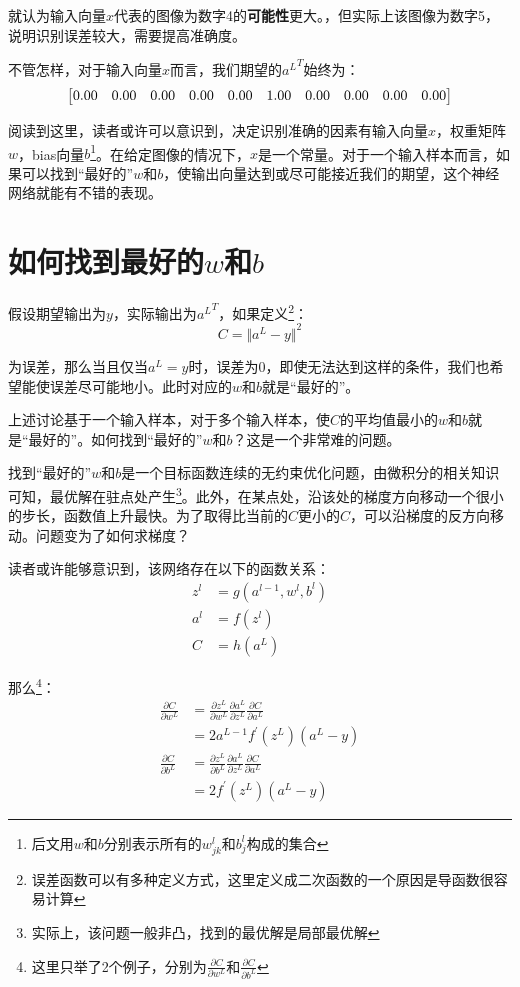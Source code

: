 \documentclass[titlepage,UTF8,zihao=-4]{ctexart}
\begin{document}
就认为输入向量$x$代表的图像为数字4的\textbf{可能性}更大。，但实际上该图像为数字5，说明识别误差较大，需要提高准确度。

不管怎样，对于输入向量$x$而言，我们期望的${a^{L}}^T$始终为：
\begin{equation*}
\begin{bmatrix}
\addtocounter{MaxMatrixCols}{28}
0.00 &
0.00 &
0.00 &
0.00 &
0.00 &
1.00 &
0.00 &
0.00 &   
0.00 &
0.00 
\end{bmatrix}
\end{equation*}

阅读到这里，读者或许可以意识到，决定识别准确的因素有输入向量$x$，权重矩阵$w$，bias向量$b$\footnote{后文用$w$和$b$分别表示所有的$w^{l}_{jk}$和$b^{l}_{j}$构成的集合}。在给定图像的情况下，$x$是一个常量。对于一个输入样本而言，如果可以找到“最好的”$w$和$b$，使输出向量达到或尽可能接近我们的期望，这个神经网络就能有不错的表现。

\section{如何找到最好的$w$和$b$}

假设期望输出为$y$，实际输出为${a^{L}}^T$，如果定义\footnote{误差函数可以有多种定义方式，这里定义成二次函数的一个原因是导函数很容易计算}：
\begin{equation*}
    C =  {\Vert a^L - y \Vert}^2
\end{equation*}

为误差，那么当且仅当$a^L = y$时，误差为0，即使无法达到这样的条件，我们也希望能使误差尽可能地小。此时对应的$w$和$b$就是“最好的”。

上述讨论基于一个输入样本，对于多个输入样本，使$C$的平均值最小的$w$和$b$就是“最好的”。如何找到“最好的”$w$和$b$？这是一个非常难的问题。

找到“最好的”$w$和$b$是一个目标函数连续的无约束优化问题，由微积分的相关知识可知，最优解在驻点处产生\footnote{实际上，该问题一般非凸，找到的最优解是局部最优解}。此外，在某点处，沿该处的梯度方向移动一个很小的步长，函数值上升最快。为了取得比当前的$C$更小的$C$，可以沿梯度的反方向移动。问题变为了如何求梯度？

读者或许能够意识到，该网络存在以下的函数关系：
\begin{align*}
z^l &= g(a^{l-1},w^l,b^l) \\
a^l &= f(z^{l}) \\
C &= h(a^L) 
\end{align*}

那么\footnote{这里只举了2个例子，分别为$\frac{\partial C}{\partial w^L}$和$\frac{\partial C}{\partial b^{L}}$}：
\begin{align*}
\frac{\partial C}{\partial w^{L}} &= \frac{\partial z^L}{\partial w^{L}}\frac{\partial a^L}{\partial z^L}\frac{\partial C}{\partial a^L} \\
&= 2a^{L-1} f^{'}(z^L)(a^L-y) \\
\frac{\partial C}{\partial b^{L}} &= \frac{\partial z^L}{\partial b^{L}}\frac{\partial a^L}{\partial z^L}\frac{\partial C}{\partial a^L} \\
&= 2 f^{'}(z^L)(a^L-y) 
\end{align*}
\end{document}
